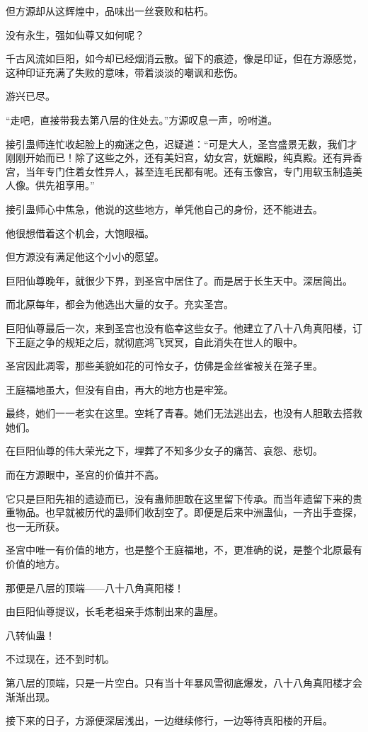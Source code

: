 \begin{this_body}
但方源却从这辉煌中，品味出一丝衰败和枯朽。

没有永生，强如仙尊又如何呢？

千古风流如巨阳，如今却已经烟消云散。留下的痕迹，像是印证，但在方源感觉，这种印证充满了失败的意味，带着淡淡的嘲讽和悲伤。

游兴已尽。

“走吧，直接带我去第八层的住处去。”方源叹息一声，吩咐道。

接引蛊师连忙收起脸上的痴迷之色，迟疑道：“可是大人，圣宫盛景无数，我们才刚刚开始而已！除了这些之外，还有美妇宫，幼女宫，妩媚殿，纯真殿。还有异香宫，当年专门住着女性异人，甚至连毛民都有呢。还有玉像宫，专门用软玉制造美人像。供先祖享用。”

接引蛊师心中焦急，他说的这些地方，单凭他自己的身份，还不能进去。

他很想借着这个机会，大饱眼福。

但方源没有满足他这个小小的愿望。

巨阳仙尊晚年，就很少下界，到圣宫中居住了。而是居于长生天中。深居简出。

而北原每年，都会为他选出大量的女子。充实圣宫。

巨阳仙尊最后一次，来到圣宫也没有临幸这些女子。他建立了八十八角真阳楼，订下王庭之争的规矩之后，就彻底鸿飞冥冥，自此消失在世人的眼中。

圣宫因此凋零，那些美貌如花的可怜女子，仿佛是金丝雀被关在笼子里。

王庭福地虽大，但没有自由，再大的地方也是牢笼。

最终，她们一一老实在这里。空耗了青春。她们无法逃出去，也没有人胆敢去搭救她们。

在巨阳仙尊的伟大荣光之下，埋葬了不知多少女子的痛苦、哀怨、悲切。

而在方源眼中，圣宫的价值并不高。

它只是巨阳先祖的遗迹而已，没有蛊师胆敢在这里留下传承。而当年遗留下来的贵重物品。也早就被历代的蛊师们收刮空了。即便是后来中洲蛊仙，一齐出手查探，也一无所获。

圣宫中唯一有价值的地方，也是整个王庭福地，不，更准确的说，是整个北原最有价值的地方。

那便是八层的顶端——八十八角真阳楼！

由巨阳仙尊提议，长毛老祖亲手炼制出来的蛊屋。

八转仙蛊！

不过现在，还不到时机。

第八层的顶端，只是一片空白。只有当十年暴风雪彻底爆发，八十八角真阳楼才会渐渐出现。

接下来的日子，方源便深居浅出，一边继续修行，一边等待真阳楼的开启。


\end{this_body}
